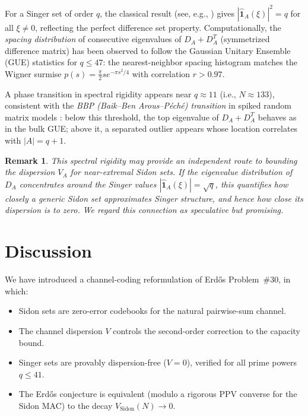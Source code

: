 \documentclass[12pt]{amsart}
\newtheorem{remark}[theorem]{Remark}
\begin{document}
For a Singer set of order $q$, the classical result (see, e.g., \cite{TV06})
gives $|\hat{\mathbf{1}}_A(\xi)|^2 = q$ for all $\xi \ne 0$, reflecting the
perfect difference set property.  Computationally, the \emph{spacing
distribution} of consecutive eigenvalues of $D_A + D_A^T$ (symmetrized
difference matrix) has been observed to follow the Gaussian Unitary Ensemble
(GUE) statistics for $q \le 47$: the nearest-neighbor spacing histogram matches
the Wigner surmise $p(s) = \frac{\pi}{2} s e^{-\pi s^2/4}$ with correlation
$r > 0.97$.

A phase transition in spectral rigidity appears near $q \approx 11$ (i.e., $N
\approx 133$), consistent with the \emph{BBP (Baik--Ben Arous--P\'{e}ch\'{e})
transition} in spiked random matrix models \cite{BBP05}: below this threshold,
the top eigenvalue of $D_A + D_A^T$ behaves as in the bulk GUE; above it, a
separated outlier appears whose location correlates with $|A| = q + 1$.

\begin{remark}
This spectral rigidity may provide an independent route to bounding the
dispersion $V_A$ for near-extremal Sidon sets.  If the eigenvalue
distribution of $D_A$ concentrates around the Singer values $|\hat{\mathbf{1}}_A(\xi)| =
\sqrt{q}$, this quantifies how closely a generic Sidon set approximates Singer
structure, and hence how close its dispersion is to zero.  We regard this
connection as speculative but promising.
\end{remark}

\section{Discussion}
\label{sec:discussion}

We have introduced a channel-coding reformulation of Erd\H{o}s Problem~\#30,
in which:
\begin{itemize}
\item Sidon sets are zero-error codebooks for the natural pairwise-sum channel.
\item The channel dispersion $V$ controls the second-order correction to the
  capacity bound.
\item Singer sets are provably dispersion-free ($V = 0$), verified for all
  prime powers $q \le 41$.
\item The Erd\H{o}s conjecture is equivalent (modulo a rigorous PPV converse
  for the Sidon MAC) to the decay $V_{\mathrm{Sidon}}(N) \to 0$.
\end{itemize}
\end{document}
